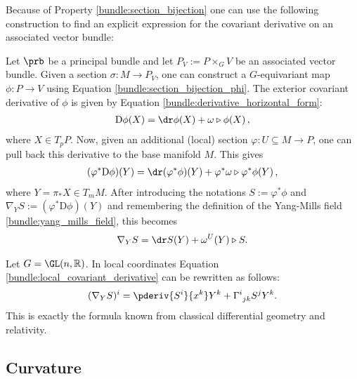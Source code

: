     Because of Property \ref{bundle:section_bijection} one can use the following construction to find an explicit expression for the covariant derivative on an associated vector bundle:
    \begin{construct}\label{bundle:covariant_derivative_associated_bundle}
        Let $\prb$ be a principal bundle and let $P_V := P\times_G V$ be an associated vector bundle. Given a section $\sigma:M\rightarrow P_V$, one can construct a $G$-equivariant map $\phi:P\rightarrow V$ using Equation \eqref{bundle:section_bijection_phi}. The exterior covariant derivative of $\phi$ is given by Equation \eqref{bundle:derivative_horizontal_form}:
        \begin{gather}
            \mathrm{D}\phi(X) = \dr\phi(X) + \omega\triangleright\phi(X)\,,
        \end{gather}
        where $X\in T_pP$. Now, given an additional (local) section $\varphi:U\subseteq M\rightarrow P$, one can pull back this derivative to the base manifold $M$. This gives
        \begin{gather}
            (\varphi^*\mathrm{D}\phi)(Y) = \dr(\varphi^*\phi)(Y) + \varphi^*\omega\triangleright\varphi^*\phi(Y)\,,
        \end{gather}
        where $Y=\pi_*X\in T_mM$. After introducing the notations $S:=\varphi^*\phi$ and $\nabla_YS:=(\varphi^*\mathrm{D}\phi)(Y)$ and remembering the definition of the Yang-Mills field \ref{bundle:yang_mills_field}, this becomes
        \begin{gather}
            \label{bundle:local_covariant_derivative}
            \nabla_YS = \dr S(Y) + \omega^U(Y)\triangleright S.
        \end{gather}
    \end{construct}
    \begin{example}
        Let $G=\GL(n,\mathbb{R})$. In local coordinates Equation \eqref{bundle:local_covariant_derivative} can be rewritten as follows:
        \begin{gather}
            (\nabla_YS)^i = \pderiv{S^i}{x^k}Y^k + \Gamma^i_{\ jk}S^jY^k.
        \end{gather}
        This is exactly the formula known from classical differential geometry and relativity.
    \end{example}

\subsection{Curvature}

